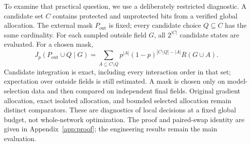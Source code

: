 To examine that practical question, we use a deliberately restricted diagnostic.
A candidate set $C$ contains protected and unprotected bits from a verified global
allocation. The external mask $P_{\mathrm{out}}$ is fixed; every candidate choice
$Q\subseteq C$ has the same cardinality. For each sampled outside field $G$, all
$2^{|C|}$ candidate states are evaluated. For a chosen mask,
\begin{equation}
J_p(P_{\mathrm{out}}\cup Q\mid G)=
\sum_{A\subseteq C\setminus Q}p^{|A|}(1-p)^{|C\setminus Q|-|A|}R(G\cup A).
\label{eq:enumeration}
\end{equation}
Candidate integration is exact, including every interaction order in that set;
expectation over outside fields is still estimated. A mask is chosen only on
model-selection data and then compared on independent final fields. Original
gradient allocation, exact isolated allocation, and bounded selected allocation
remain distinct comparators. These are diagnostics of local decisions at a fixed
global budget, not whole-network optimization. The proof and paired-swap identity
are given in Appendix~\ref{app:proof}; the engineering results remain the main
evaluation.

